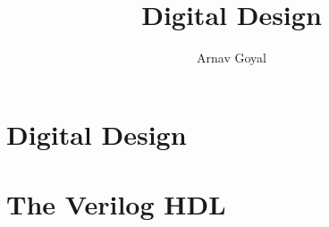 
\lstset{
	language=Verilog
}

\title{Digital Design}
\author{Arnav Goyal}

\def\myreferences{
	\item Provided Course Materials from ECE 2277, ECE 3375
	\item Digital Design with an Introduction to the Verilog HDL - 5e - M. Mano, D. Ciletti
	\item Verilog Complete Tutorial - VLSI Point (\href{https://www.youtube.com/playlist?list=PL_3xKnVkfI2itQhCyfnamNYSCHd2KHi4k}{YouTube Link})
}


	\frontmatter
	\maketitle
	\preface
		
	\mainmatter
	
	\part{Digital Design}
	
	
	
	
	
	
	\part{The Verilog HDL}
	
	
	
	
